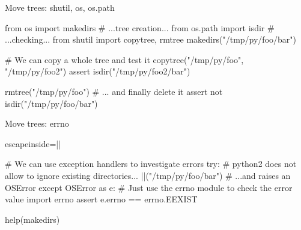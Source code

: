 \begin{pyframe}{Move trees: shutil, os, os.path}
\begin{pycode}
from os import makedirs     # ...tree creation...
from os.path import isdir   # ...checking...
from shutil import copytree, rmtree
makedirs("/tmp/py/foo/bar")

# We can copy a whole tree and test it
copytree("/tmp/py/foo", "/tmp/py/foo2")
assert isdir("/tmp/py/foo2/bar")

rmtree("/tmp/py/foo") # ... and finally delete it
assert not isdir("/tmp/py/foo/bar")
\end{pycode}
\end{pyframe}

\begin{pyframe}{Move trees: errno}
\begin{pycode*}{escapeinside=||}

# We can use exception handlers to investigate errors
try:
    # python2 does not allow to ignore existing directories...
    ||("/tmp/py/foo/bar")
    #  ...and raises an OSError
except OSError as e:
    # Just use the errno module to check the error value
    import errno
    assert e.errno == errno.EEXIST

help(makedirs)
\end{pycode*}
\end{pyframe}

